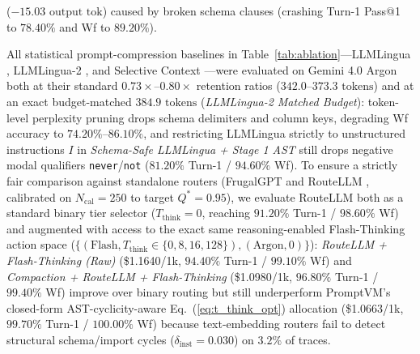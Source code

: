\documentclass[conference,10pt]{IEEEtran}
\begin{document}
($-15.03\text{ output tok}$) caused by broken schema clauses (crashing Turn-1 Pass@1 to $78.40\%$ and Wf to $89.20\%$).

All statistical prompt-compression baselines in Table~\ref{tab:ablation}---LLMLingua \cite{jiang2023llmlingua, jiang2024longllmlingua}, LLMLingua-2 \cite{pan2024llmlingua2}, and Selective Context \cite{li2023selective}---were evaluated on Gemini 4.0 Argon both at their standard $0.73\times\text{--}0.80\times$ retention ratios ($342.0\text{--}373.3\text{ tokens}$) and at an exact budget-matched $384.9\text{ tokens}$ (\textit{LLMLingua-2 Matched Budget}): token-level perplexity pruning drops schema delimiters and column keys, degrading Wf accuracy to $74.20\%\text{--}86.10\%$, and restricting LLMLingua strictly to unstructured instructions $I$ in \textit{Schema-Safe LLMLingua + Stage 1 AST} still drops negative modal qualifiers \texttt{never}/\texttt{not} ($81.20\%$ Turn-1 / $94.60\%$ Wf). To ensure a strictly fair comparison against standalone routers (FrugalGPT \cite{frugalgpt2023} and RouteLLM \cite{ong2025routellm}, calibrated on $N_{\text{cal}}=250$ to target $Q^*=0.95$), we evaluate RouteLLM both as a standard binary tier selector ($T_{\text{think}}=0$, reaching $91.20\%$ Turn-1 / $98.60\%$ Wf) and augmented with access to the exact same reasoning-enabled Flash-Thinking action space ($\{(\text{Flash}, T_{\text{think}} \in \{0, 8, 16, 128\}), (\text{Argon}, 0)\}$): \textit{RouteLLM + Flash-Thinking (Raw)} (\$1.1640/1k, $94.40\%$ Turn-1 / $99.10\%$ Wf) and \textit{Compaction + RouteLLM + Flash-Thinking} (\$1.0980/1k, $96.80\%$ Turn-1 / $99.40\%$ Wf) improve over binary routing but still underperform PromptVM's closed-form AST-cyclicity-aware Eq.~(\ref{eq:t_think_opt}) allocation (\$1.0663/1k, $99.70\%$ Turn-1 / $100.00\%$ Wf) because text-embedding routers fail to detect structural schema/import cycles ($\delta_{\text{inst}}=0.030$) on $3.2\%$ of traces.
\end{document}
